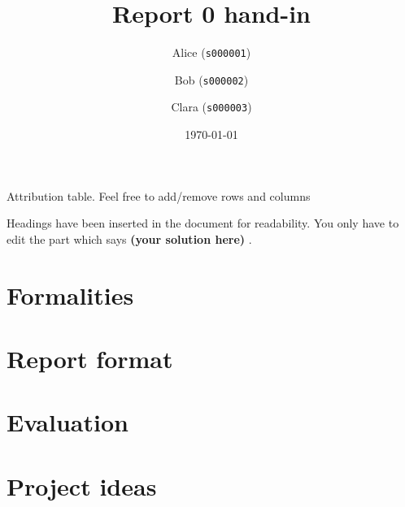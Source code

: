 \documentclass[12pt,twoside]{article}
\title{ Report 0 hand-in }
\date{ \today }
\author{Alice (\texttt{s000001})\and  Bob (\texttt{s000002})\and Clara (\texttt{s000003}) }
\newcommand\redt[1]{ {\textcolor[rgb]{0.60, 0.00, 0.00}{\textbf{ #1} } } }
\newcommand{\yoursolution}{ \redt{(your solution here) } }
\begin{document}
\maketitle

\begin{table}[ht!]
\caption{Attribution table. Feel free to add/remove rows and columns}

\end{table}


Headings have been inserted in the document for readability. You only have to edit the part which says \yoursolution. 

\section{Formalities}
\section{Report format}
\section{Evaluation}
\section{Project ideas}
\end{document}
